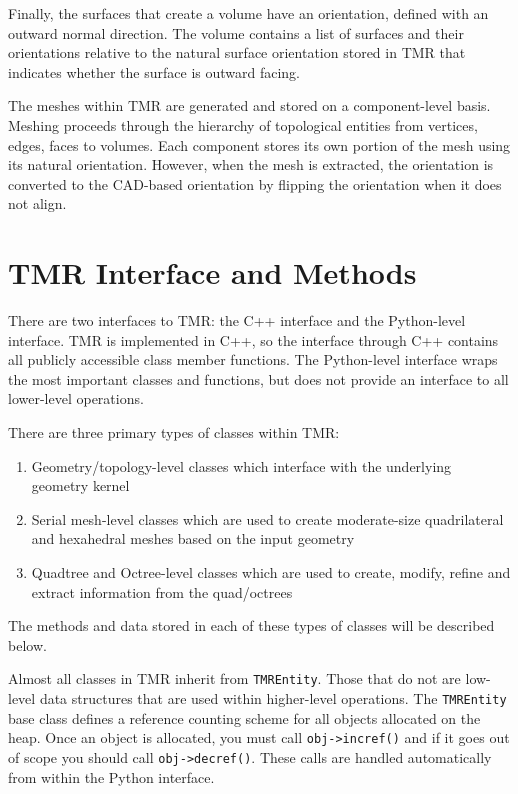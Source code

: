 \documentclass[12pt]{article}
\begin{document}
Finally, the surfaces that create a volume have an orientation, defined with an outward normal direction.
The volume contains a list of surfaces and their orientations relative to the natural surface orientation stored in TMR that indicates whether the surface is outward facing.

The meshes within TMR are generated and stored on a component-level basis.
Meshing proceeds through the hierarchy of topological entities from vertices, edges, faces to volumes.
Each component stores its own portion of the mesh using its natural orientation.
However, when the mesh is extracted, the orientation is converted to the CAD-based orientation by flipping the orientation when it does not align. 

\section{TMR Interface and Methods}

There are two interfaces to TMR: the C++ interface and the Python-level interface. 
TMR is implemented in C++, so the interface through C++ contains all publicly accessible class member functions.
The Python-level interface wraps the most important classes and functions, but does not provide an interface to all lower-level operations.

There are three primary types of classes within TMR:
\begin{enumerate}
\item Geometry/topology-level classes which interface with the underlying geometry kernel 
\item Serial mesh-level classes which are used to create moderate-size quadrilateral and hexahedral meshes based on the input geometry
\item Quadtree and Octree-level classes which are used to create, modify, refine and extract information from the quad/octrees
\end{enumerate}
%
The methods and data stored in each of these types of classes will be described below.

Almost all classes in TMR inherit from \texttt{TMREntity}. 
Those that do not are low-level data structures that are used within higher-level operations.
The \texttt{TMREntity} base class defines a reference counting scheme for all objects allocated on the heap. 
Once an object is allocated, you must call \texttt{obj->incref()} and if it goes out of scope you should call \texttt{obj->decref()}.
These calls are handled automatically from within the Python interface.
\end{document}
